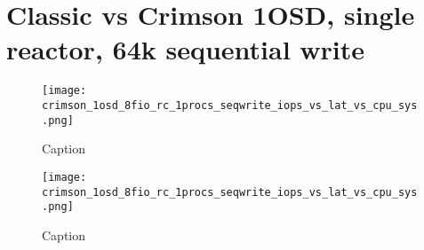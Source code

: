 \documentclass[]{report}
\begin{document}
\chapter{Classic vs Crimson 1OSD, single reactor, 64k sequential write}
\begin{figure}[ht]
  \centering
  \texttt{[image: crimson\_1osd\_8fio\_rc\_1procs\_seqwrite\_iops\_vs\_lat\_vs\_cpu\_sys.png]}
\caption{Caption}
\end{figure}

\begin{figure}[h]
  \centering
  \texttt{[image: crimson\_1osd\_8fio\_rc\_1procs\_seqwrite\_iops\_vs\_lat\_vs\_cpu\_sys.png]}
\caption{Caption}
\end{figure}
\end{document}

